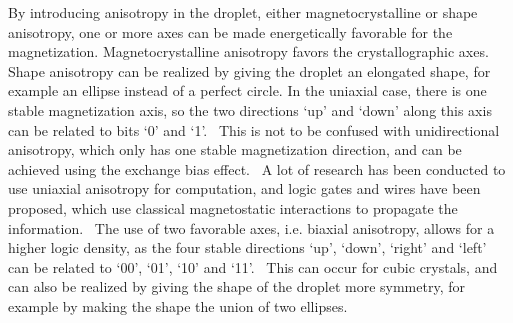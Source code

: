 \documentclass[12pt,a4paper]{article}
\begin{document}
By introducing anisotropy in the droplet, either magnetocrystalline or shape anisotropy, one or more axes can be made energetically favorable for the magnetization. Magnetocrystalline anisotropy favors the crystallographic axes. Shape anisotropy can be realized by giving the droplet an elongated shape, for example an ellipse instead of a perfect circle. In the uniaxial case, there is one stable magnetization axis, so the two directions `up' and `down' along this axis can be related to bits `0' and `1'.~\cite{MQCA_RoomTemp} This is not to be confused with unidirectional anisotropy, which only has one stable magnetization direction, and can be achieved using the exchange bias effect.~\cite{ExchangeBias_Mechanisms,ExchangeBias_nanostructures,ExchangeBias} A lot of research has been conducted to use uniaxial anisotropy for computation, and logic gates and wires have been proposed, which use classical magnetostatic interactions to propagate the information.~\cite{GYP-18,MQCA_MajorityGate,SwitchingForced_EnergyEfficient} The use of two favorable axes, i.e. biaxial anisotropy, allows for a higher logic density, as the four stable directions `up', `down', `right' and `left' can be related to `00', `01', `10' and `11'.~\cite{MQCA_ImageRecognition} This can occur for cubic crystals, and can also be realized by giving the shape of the droplet more symmetry, for example by making the shape the union of two ellipses.
\end{document}
